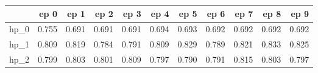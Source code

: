 \begin{tabular}{lrrrrrrrrrr}
\toprule
{} &   ep 0 &   ep 1 &   ep 2 &   ep 3 &   ep 4 &   ep 5 &   ep 6 &   ep 7 &   ep 8 &   ep 9 \\
\midrule
hp\_0 &  0.755 &  0.691 &  0.691 &  0.691 &  0.694 &  0.693 &  0.692 &  0.692 &  0.692 &  0.692 \\
hp\_1 &  0.809 &  0.819 &  0.784 &  0.791 &  0.809 &  0.829 &  0.789 &  0.821 &  0.833 &  0.825 \\
hp\_2 &  0.799 &  0.803 &  0.801 &  0.809 &  0.797 &  0.790 &  0.791 &  0.815 &  0.803 &  0.797 \\
\bottomrule
\end{tabular}
